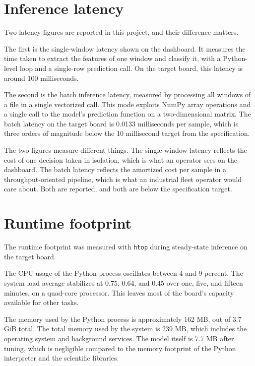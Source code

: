 \section{Inference latency}
\label{sec:latency}

Two latency figures are reported in this project, and their difference matters.

The first is the single-window latency shown on the dashboard. It measures the time taken to extract the features of one window and classify it, with a Python-level loop and a single-row prediction call. On the target board, this latency is around 100 milliseconds.

The second is the batch inference latency, measured by processing all windows of a file in a single vectorized call. This mode exploits NumPy array operations and a single call to the model's prediction function on a two-dimensional matrix. The batch latency on the target board is 0.0133 milliseconds per sample, which is three orders of magnitude below the 10 millisecond target from the specification.

The two figures measure different things. The single-window latency reflects the cost of one decision taken in isolation, which is what an operator sees on the dashboard. The batch latency reflects the amortized cost per sample in a throughput-oriented pipeline, which is what an industrial fleet operator would care about. Both are reported, and both are below the specification target.

\section{Runtime footprint}

The runtime footprint was measured with \texttt{htop} during steady-state inference on the target board.

The CPU usage of the Python process oscillates between 4 and 9 percent. The system load average stabilizes at 0.75, 0.64, and 0.45 over one, five, and fifteen minutes, on a quad-core processor. This leaves most of the board's capacity available for other tasks.

The memory used by the Python process is approximately 162 MB, out of 3.7 GiB total. The total memory used by the system is 239 MB, which includes the operating system and background services. The model itself is 7.7 MB after tuning, which is negligible compared to the memory footprint of the Python interpreter and the scientific libraries.

